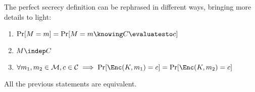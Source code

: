 The perfect secrecy definition can be rephrased in different ways, bringing more details to light:
\begin{enumerate}
    \item \label{def:ps1} $\Pr[M = m] = \Pr[M = m \knowing C \evaluatesto c]$
    \item \label{def:ps2}$M \indep C$
    \item \label{def:ps3}$\forall m_1, m_2 \in \M, c \in \C \implies \Pr[\Enc(K, m_1) = c] = \Pr[\Enc(K, m_2) = c]$
\end{enumerate}
    
\begin{proposition}
    All the previous statements are equivalent.
\end{proposition}

